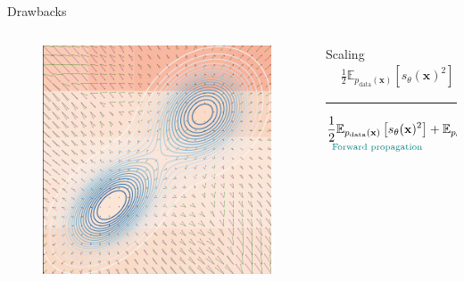 \documentclass[handout, aspectratio=169,xcolor=dvipsnames]{beamer}
\newcommand{\bx}{\mathbf{x}}
\newcommand{\nbx}{\nabla_{\bx}}
\begin{document}
\begin{frame}{Drawbacks}
\begin{columns}
\begin{column}{0.4\textwidth}
        \begin{figure}
          \centering
        \includegraphics[height=0.32\textheight]{figs/gen/score_field_training_final}
      \end{figure}
    \end{column}
    \pause
    \begin{column}{0.6\textwidth}
      \centering
      Scaling
      \pause
      \centering
      \begin{align*}
        &\frac{1}{2}\mathbb{E}_{p_\text{data}(\bx)} \left[ s_\theta(\bx)^2\right] + \mathbb{E}_{p_\text{data}(\bx)}\left[\nbx s_\theta(\bx) \right]
      \end{align*}
      \pause
      
      \rule{0.8\textwidth}{0.4pt}
      
      \begin{align*}
        \underset{
          \textcolor{teal}{\text{Forward propagation}}
        }{ \frac{1}{2}\mathbb{E}_{p_\text{data}(\bx)} \left[ s_\theta(\bx)^2\right]} 
        + \underset{
          \textcolor{red}{\text{Backprops}~\propto~\text{dim}(\bx)}
        }{\mathbb{E}_{p_\text{data}(\bx)}\left[\text{trace}(\nbx s_\theta(\bx)) \right]}
      \end{align*}
    \end{column}
  \end{columns}
\end{frame}
\end{document}
